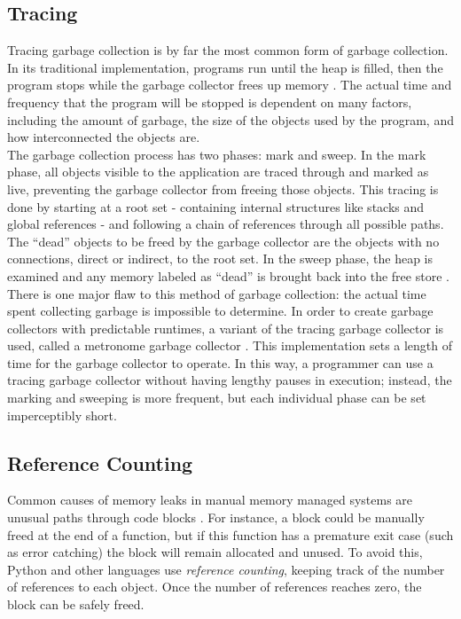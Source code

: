 \documentclass[12pt]{article}
\begin{document}
\subsection{Tracing}
Tracing garbage collection is by far the most common form of garbage collection. In its traditional implementation, programs run until the heap is filled, then the program stops while the garbage collector frees up memory \cite{ibmJava}. The actual time and frequency that the program will be stopped is dependent on many factors, including the amount of garbage, the size of the objects used by the program, and how interconnected the objects are.\\

The garbage collection process has two phases: mark and sweep. In the mark phase, all objects visible to the application are traced through and marked as live, preventing the garbage collector from freeing those objects. This tracing is done by starting at a root set - containing internal structures like stacks and global references - and following a chain of references through all possible paths. The ``dead'' objects to be freed by the garbage collector are the objects with no connections, direct or indirect, to the root set. In the sweep phase, the heap is examined and any memory labeled as ``dead'' is brought back into the free store \cite{ibmJava}.\\

There is one major flaw to this method of garbage collection: the actual time spent collecting garbage is impossible to determine. In order to create garbage collectors with predictable runtimes, a variant of the tracing garbage collector is used, called a metronome garbage collector \cite{ibmJava}. This implementation sets a length of time for the garbage collector to operate. In this way, a programmer can use a tracing garbage collector without having lengthy pauses in execution; instead, the marking and sweeping is more frequent, but each individual phase can be set imperceptibly short.
\subsection{Reference Counting}
Common causes of memory leaks in manual memory managed systems are unusual paths through code blocks \cite{pythDocs}. For instance, a block could be manually freed at the end of a function, but if this function has a premature exit case (such as error catching) the block will remain allocated and unused. To avoid this, Python and other languages use {\it reference counting}, keeping track of the number of references to each object. Once the number of references reaches zero, the block can be safely freed.\\
\end{document}
